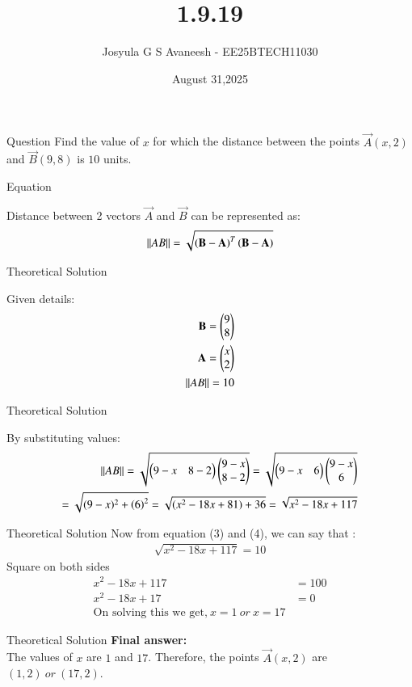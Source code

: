 \documentclass{beamer}
\title %
{1.9.19}
\date{August 31,2025}
\author 
{Josyula G S Avaneesh - EE25BTECH11030}
\begin{document}
\frame{\titlepage}
\begin{frame}{Question}
Find the value of $x$ for which the distance between the points $\vec{A}(x,2)$ and $\vec{B}(9,8)$ is $10$ units.
\end{frame}



\begin{frame}{Equation}

Distance between 2 vectors $\vec{A}$ and $\vec{B}$ can be represented as:
\begin{align}
    \left\lVert AB\right\rVert=\sqrt{\left(\mathbf{B}-\mathbf{A}\right)^T\left(\mathbf{B}-\mathbf{A}\right)}
\end{align}
\end{frame}

\begin{frame}{Theoretical Solution}

Given details:
\begin{align}
    \mathbf{B}=\begin{pmatrix}9\\8\end{pmatrix}\\  \mathbf{A}=\begin{pmatrix}x\\2\end{pmatrix}\\ \left\lVert AB\right\rVert=10 
\end{align}
\end{frame}

\begin{frame}{Theoretical Solution}

By substituting values:
\begin{align}
    \left\lVert AB\right\rVert=\sqrt{\begin{pmatrix}9-x & 8-2\end{pmatrix}\begin{pmatrix}9-x \\8-2\end{pmatrix}}=\sqrt{\begin{pmatrix}9-x & 6\end{pmatrix}\begin{pmatrix}9-x \\6\end{pmatrix}}\\
    =\sqrt{(9-x)^2+ \left(6\right)^2} =\sqrt{(x^2-18x+81)+36}=\sqrt{x^2-18x+117}
\end{align}

\end{frame}


\begin{frame}{Theoretical Solution}
Now from equation (3) and (4), we can say that :
\begin{align}
     \sqrt{x^2-18x+117}=10
\end{align}
Square on both sides
\begin{align}
   x^2 -18x+117&=100\\
    x^2-18x+17&=0\\
    \text{On solving this we get,}\
    x=1\  or\ x=17
\end{align}

\end{frame}
\begin{frame}{Theoretical Solution}
\textbf{Final answer:}\\
The values of $x$ are $1$ and $17$.
Therefore, the points $\vec{A}(x,2)$ are $(1,2) \ or \ (17,2)$.
\end{frame}
\end{document}
